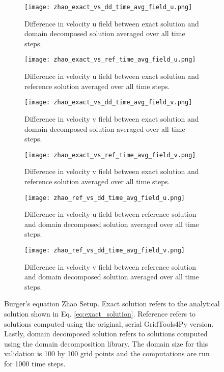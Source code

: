 \begin{figure}[!htbp]
\centering
\begin{subfigure}{0.45\textwidth}
  \centering
  \texttt{[image: zhao\_exact\_vs\_dd\_time\_avg\_field\_u.png]}
  \caption{Difference in velocity u field between exact solution and domain decomposed solution averaged over all time steps.}
  \label{fig:burgers_val1}
\end{subfigure} \hfill
\begin{subfigure}{0.45\textwidth}
  \centering
  \texttt{[image: zhao\_exact\_vs\_ref\_time\_avg\_field\_u.png]}
  \caption{Difference in velocity u field between exact solution and reference solution averaged over all time steps.}
  \label{fig:burgers_val2}
\end{subfigure}

\begin{subfigure}{0.45\textwidth}
  \centering
  \texttt{[image: zhao\_exact\_vs\_dd\_time\_avg\_field\_v.png]}
  \caption{Difference in velocity v field between exact solution and domain decomposed solution averaged over all time steps.}
  \label{fig:burgers_val3}
\end{subfigure} \hfill
\begin{subfigure}{0.45\textwidth}
  \centering
  \texttt{[image: zhao\_exact\_vs\_ref\_time\_avg\_field\_v.png]}
  \caption{Difference in velocity v field between exact solution and reference solution averaged over all time steps.}
  \label{fig:burgers_val4}
\end{subfigure}

\begin{subfigure}{0.45\textwidth}
  \centering
  \texttt{[image: zhao\_ref\_vs\_dd\_time\_avg\_field\_u.png]}
  \caption{Difference in velocity u field between reference solution and domain decomposed solution averaged over all time steps.}
  \label{fig:burgers_val5}
\end{subfigure} \hfill
\begin{subfigure}{0.45\textwidth}
  \centering
  \texttt{[image: zhao\_ref\_vs\_dd\_time\_avg\_field\_v.png]}
  \caption{Difference in velocity v field between reference solution and domain decomposed solution averaged over all time steps.}
  \label{fig:burgers_val6}
\end{subfigure}
\caption{Burger's equation Zhao Setup. 
Exact solution refers to the analytical solution shown in Eq. \ref{eq:exact_solution}.
Reference refers to solutions computed using the original, serial GridTools4Py version.
Lastly, domain decomposed solution refers to solutions computed using the domain decomposition library.
The domain size for this validation is 100 by 100 grid points and the computations are run for 1000 time steps.
}
\label{fig:burgers_validation}
\end{figure}


